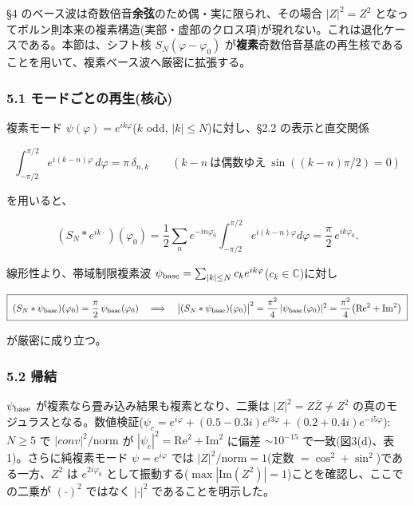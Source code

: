 \documentclass[
]{ltjsarticle}
\begin{document}
§4 のベース波は奇数倍音\textbf{余弦}のため偶・実に限られ、その場合
\(|Z|^2=Z^2\)
となってボルン則本来の複素構造(実部・虚部のクロス項)が現れない。これは退化ケースである。本節は、シフト核
\(S_N(\varphi-\varphi_0)\)
が\textbf{複素}奇数倍音基底の再生核であることを用いて、複素ベース波へ厳密に拡張する。

\subsubsection{5.1
モードごとの再生(核心)}\label{ux30e2ux30fcux30c9ux3054ux3068ux306eux518dux751fux6838ux5fc3}

複素モード \(\psi(\varphi)=e^{ik\varphi}\)(\(k\) odd,
\(|k|\le N\))に対し、§2.2 の表示と直交関係

\[
\int_{-\pi/2}^{\pi/2}e^{i(k-n)\varphi}\,d\varphi=\pi\,\delta_{n,k}\qquad(k-n\ \text{は偶数ゆえ}\ \sin((k-n)\pi/2)=0)
\]

を用いると、

\[
(S_N*e^{ik\cdot})(\varphi_0)=\frac12\sum_{n}e^{-in\varphi_0}\!\int_{-\pi/2}^{\pi/2}\!e^{i(k-n)\varphi}d\varphi
=\frac{\pi}{2}\,e^{ik\varphi_0}.
\]

線形性より、帯域制限複素波
\(\psi_{\rm base}=\sum_{|k|\le N}c_k e^{ik\varphi}\)(\(c_k\in\mathbb C\))に対し

\[
\boxed{\;(S_N*\psi_{\rm base})(\varphi_0)=\frac{\pi}{2}\,\psi_{\rm base}(\varphi_0)
\quad\Longrightarrow\quad
\big|(S_N*\psi_{\rm base})(\varphi_0)\big|^2=\frac{\pi^2}{4}\,|\psi_{\rm base}(\varphi_0)|^2
=\frac{\pi^2}{4}\big(\mathrm{Re}^2+\mathrm{Im}^2\big)\;}
\]

が厳密に成り立つ。

\subsubsection{5.2 帰結}\label{ux5e30ux7d50}

\(\psi_{\rm base}\) が複素なら畳み込み結果も複素となり、二乗は
\textbf{\(|Z|^2=Z\bar Z\ne Z^2\)}
の真のモジュラスとなる。数値検証(\(\psi_c=e^{i\varphi}+(0.5-0.3i)e^{i3\varphi}+(0.2+0.4i)e^{-i5\varphi}\)):\(N\ge5\)
で \(|conv|^2/\mathrm{norm}\) が
\(|\psi_c|^2=\mathrm{Re}^2+\mathrm{Im}^2\) に偏差 \(\sim10^{-15}\)
で一致(図3(d)、表1)。さらに純複素モード \(\psi=e^{i\varphi}\) では
\(|Z|^2/\mathrm{norm}=1\)(定数 \(=\cos^2+\sin^2\))である一方、\(Z^2\) は
\(e^{2i\varphi_0}\)
として振動する(\(\max|\mathrm{Im}(Z^2)|=1\))ことを確認し、ここでの二乗が
\((\cdot)^2\) ではなく \(|\cdot|^2\) であることを明示した。
\end{document}
